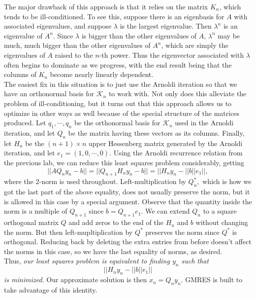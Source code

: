 \indent The major drawback of this approach is that it relies on the matrix $K_n$, which tends to be ill-conditioned.
To see this, suppose there is an eigenbasis for $A$ with associated eigenvalues, and suppose $\lambda$ is the largest eigenvalue.
Then $\lambda^n$ is an eigenvalue of $A^n$.
Since $\lambda$ is bigger than the other eigenvalues of $A$, $\lambda^n$ may be much, much bigger than the other eigenvalues of $A^n$, which are simply the eigenvalues of $A$ raised to the $n$-th power.
Thus the eigenvector associated with $\lambda$ often begins to dominate as we progress, with the end result being that the columns of $K_n$ become nearly linearly dependent. \\
\indent The easiest fix in this situation is to just use the Arnoldi iteration so that we have an orthonormal basis for $\mathcal{K}_n$ to work with.
Not only does this alleviate the problem of ill-conditioning, but it turns out that this approach allows us to optimize in other ways as well because of the special structure of the matrices produced.
Let $q_1,\cdots, q_n$ be the orthonormal basis for $\mathcal{K}_n$ used in the Arnoldi iteration, and let $Q_n$ be the matrix having these vectors as its columns.
Finally, let $H_n$ be the $(n+1)\times n$ upper Hessenberg matrix generated by the Arnoldi iteration, and let $e_1=(1,0,\cdots,0).$
Using the Arnoldi recurrence relation from the previous lab, we can reduce this least squares problem considerably, getting
$$||AQ_n y_n-b||=||Q_{n+1}H_{n}y_n-b||=||H_ny_n-||b||e_1||,$$
where the 2-norm is used throughout.
Left-multiplication by $Q_n^*,$ which is how we got the last part of the above equality, does not usually preserve the norm, but it is allowed in this case by a special argument.
Observe that the quantity inside the norm is a multiple of $Q_{n+1}$ since $b=Q_{n+1}e_1$.
We can extend $Q_n$ to a square orthogonal matrix $Q$ and add zeros to the end of the $H_n$ and $b$ without changing the norm.
But then left-mupltiplication by $Q^*$ preserves the norm since $Q^*$ is orthogonal.
Reducing back by deleting the extra entries from before doesn't affect the norms in this case, so we have the last equality of norms, as desired.\\
\indent Thus, \emph{our least squares problem is equivalent to finding $y_n$ such that $$||H_ny_n-||b||e_1||$$ is minimized.}
Our approximate solution is then $x_n=Q_ny_n.$ GMRES is built to take advantage of this identity.


